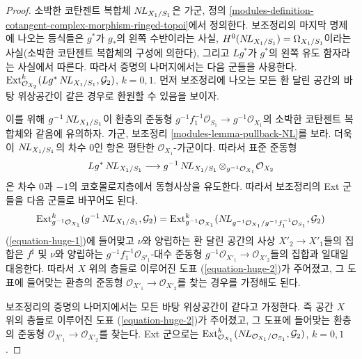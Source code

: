\begin{proof}
소박한 코탄젠트 복합체 $\mathop{N\!L}\nolimits_{X_1/S_1}$은 가군, 정의
\ref{modules-definition-cotangent-complex-morphism-ringed-topoi}에서
정의한다. 보조정리의 마지막 명제에 나오는 등식들은 $g^*$가
$g_*$의 왼쪽 수반이라는 사실,
$H^0(\mathop{N\!L}\nolimits_{X_1/S_1}) = \Omega_{X_1/S_1}$이라는 사실(소박한 코탄젠트
복합체의 구성에 의한다), 그리고 $Lg^*$가 $g^*$의 왼쪽 유도
함자라는 사실에서 따른다. 따라서 증명의 나머지에서는 다음 군들을
사용한다.
$\mathop{\mathrm{Ext}}\nolimits^k_{\mathcal{O}_{X_2}}(Lg^*\mathop{N\!L}\nolimits_{X_1/S_1}, \mathcal{G}_2)$,
$k = 0, 1$. 먼저 보조정리에 나오는 모든 환 달린 공간의 바탕
위상공간이 같은 경우로 환원할 수 있음을 보이자.

\medskip\noindent
이를 위해 $g^{-1}\mathop{N\!L}\nolimits_{X_1/S_1}$이 환층의 준동형
$g^{-1}f_1^{-1}\mathcal{O}_{S_1} \to g^{-1}\mathcal{O}_{X_1}$의
소박한 코탄젠트 복합체와 같음에 유의하자. 가군, 보조정리
\ref{modules-lemma-pullback-NL}를 보라. 더욱이
$\mathop{N\!L}\nolimits_{X_1/S_1}$의 차수 $0$인 항은 평탄한 $\mathcal{O}_{X_1}$-가군이다.
따라서 표준 준동형
$$
Lg^*\mathop{N\!L}\nolimits_{X_1/S_1}
\longrightarrow
g^{-1}\mathop{N\!L}\nolimits_{X_1/S_1} \otimes_{g^{-1}\mathcal{O}_{X_1}} \mathcal{O}_{X_2}
$$
은 차수 $0$과 $-1$의 코호몰로지층에서 동형사상을 유도한다.
따라서 보조정리의 Ext 군들을 다음 군들로 바꾸어도 된다.
$$
\mathop{\mathrm{Ext}}\nolimits^k_{g^{-1}\mathcal{O}_{X_1}}(g^{-1}\mathop{N\!L}\nolimits_{X_1/S_1}, \mathcal{G}_2) =
\mathop{\mathrm{Ext}}\nolimits^k_{g^{-1}\mathcal{O}_{X_1}}(
\mathop{N\!L}\nolimits_{g^{-1}\mathcal{O}_{X_1}/g^{-1}f_1^{-1}\mathcal{O}_{S_1}}, \mathcal{G}_2)
$$
(\ref{equation-huge-1})에 들어맞고 $\nu$와 양립하는 환 달린 공간의
사상 $X'_2 \to X'_1$들의 집합은 $f^\sharp$ 및 $\nu$와 양립하는
$g^{-1}f_1^{-1}\mathcal{O}_{S'_1}$-대수 준동형
$g^{-1}\mathcal{O}_{X'_1} \to \mathcal{O}_{X'_2}$들의 집합과
일대일 대응한다. 따라서 $X$ 위의 층들로 이루어진 도표
(\ref{equation-huge-2})가 주어졌고, 그 도표에 들어맞는 환층의 준동형
$\mathcal{O}_{X'_1} \to \mathcal{O}_{X'_2}$를 찾는 경우를 가정해도
된다.

\medskip\noindent
보조정리의 증명의 나머지에서는 모든 바탕 위상공간이 같다고
가정한다. 즉 공간 $X$ 위의 층들로 이루어진 도표
(\ref{equation-huge-2})가 주어졌고, 그 도표에 들어맞는 환층의 준동형
$\mathcal{O}_{X'_1} \to \mathcal{O}_{X'_2}$를 찾는다. Ext 군으로는
$\mathop{\mathrm{Ext}}\nolimits^k_{\mathcal{O}_{X_1}}(
\mathop{N\!L}\nolimits_{\mathcal{O}_{X_1}/\mathcal{O}_{S_1}}, \mathcal{G}_2)$, $k = 0, 1$.


\end{proof}
